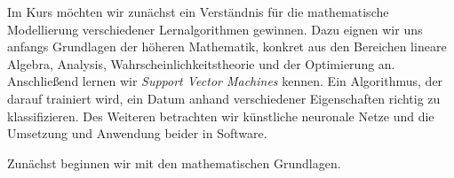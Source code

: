 Im Kurs möchten wir zunächst ein Verständnis für die mathematische Modellierung verschiedener Lernalgorithmen gewinnen. Dazu eignen wir uns anfangs Grundlagen der höheren Mathematik, konkret aus den Bereichen lineare Algebra, Analysis, Wahrscheinlichkeitstheorie und der Optimierung an. Anschließend lernen wir \emph{Support Vector Machines} kennen. Ein Algorithmus, der darauf trainiert wird, ein Datum anhand verschiedener Eigenschaften richtig zu klassifizieren. Des Weiteren betrachten wir künstliche neuronale Netze und die Umsetzung und Anwendung beider in Software.

Zunächst beginnen wir mit den mathematischen Grundlagen.
